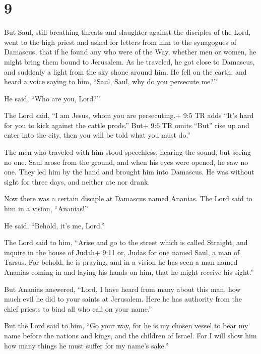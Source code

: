 \hypertarget{section-8}{%
\section{9}\label{section-8}}

 But Saul, still breathing threats and slaughter against the
disciples of the Lord, went to the high priest  and asked
for letters from him to the synagogues of Damascus, that if he found any
who were of the Way, whether men or women, he might bring them bound to
Jerusalem.  As he traveled, he got close to Damascus, and
suddenly a light from the sky shone around him.  He fell on
the earth, and heard a voice saying to him, ``Saul, Saul, why do you
persecute me?''

 He said, ``Who are you, Lord?''

The Lord said, ``I am Jesus, whom you are persecuting.+ 9:5 TR adds
``It's hard for you to kick against the cattle prods.'' 
But+ 9:6 TR omits ``But'' rise up and enter into the city, then you will
be told what you must do.''

 The men who traveled with him stood speechless, hearing the
sound, but seeing no one.  Saul arose from the ground, and
when his eyes were opened, he saw no one. They led him by the hand and
brought him into Damascus.  He was without sight for three
days, and neither ate nor drank.

 Now there was a certain disciple at Damascus named
Ananias. The Lord said to him in a vision, ``Ananias!''

He said, ``Behold, it's me, Lord.''

 The Lord said to him, ``Arise and go to the street which
is called Straight, and inquire in the house of Judah+ 9:11 or, Judas
for one named Saul, a man of Tarsus. For behold, he is praying,
 and in a vision he has seen a man named Ananias coming in
and laying his hands on him, that he might receive his sight.''

 But Ananias answered, ``Lord, I have heard from many about
this man, how much evil he did to your saints at Jerusalem.
 Here he has authority from the chief priests to bind all
who call on your name.''

 But the Lord said to him, ``Go your way, for he is my
chosen vessel to bear my name before the nations and kings, and the
children of Israel.  For I will show him how many things he
must suffer for my name's sake.''

